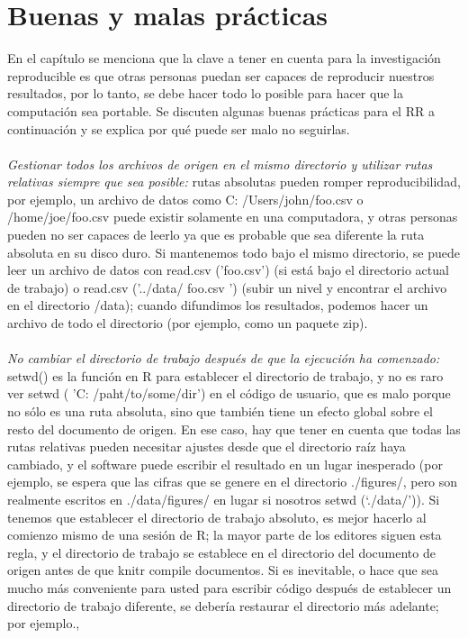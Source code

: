 \documentclass[conference]{IEEEtran}
\begin{document}
\section{Buenas y malas prácticas}
En el capítulo se menciona que la clave a tener en cuenta para la investigación reproducible es que otras personas puedan ser capaces de reproducir nuestros resultados, por lo tanto, se debe hacer todo lo posible para hacer que la computación sea portable. Se discuten algunas buenas prácticas para el RR a continuación y se explica por qué puede ser malo no seguirlas.\\\\
\textit{Gestionar todos los archivos de origen en el mismo directorio y utilizar rutas relativas siempre que sea posible:} rutas absolutas pueden romper reproducibilidad, por ejemplo, un archivo de datos como C: /Users/john/foo.csv o /home/joe/foo.csv puede existir solamente en una computadora, y otras personas pueden no ser capaces de leerlo ya que es probable que sea diferente la ruta absoluta en su disco duro. Si mantenemos todo bajo el mismo directorio, se puede leer un archivo de datos con read.csv ('foo.csv') (si está bajo el directorio actual de trabajo) o read.csv ('../data/ foo.csv ') (subir un nivel y encontrar el archivo en el directorio /data); cuando difundimos los resultados, podemos hacer un archivo de todo el directorio (por ejemplo, como un paquete zip).\\\\
\textit{No cambiar el directorio de trabajo después de que la ejecución ha comenzado:} setwd() es la función en R para establecer el directorio de trabajo, y no es raro ver setwd ( 'C: /paht/to/some/dir') en el código de usuario, que es malo porque no sólo es una ruta absoluta, sino que también tiene un efecto global sobre el resto del documento de origen. En ese caso, hay que tener en cuenta que todas las rutas relativas pueden necesitar ajustes desde que el directorio raíz haya cambiado, y el software puede escribir el resultado en un lugar inesperado (por ejemplo, se espera que las cifras que se genere en el directorio ./figures/, pero son realmente escritos en ./data/figures/ en lugar si nosotros setwd (‘./data/')). Si tenemos que establecer el directorio de trabajo absoluto, es mejor hacerlo al comienzo mismo de una sesión de R; la mayor parte de los editores  siguen esta regla, y el directorio de trabajo se establece en el directorio del documento de origen antes de que knitr compile documentos. Si es inevitable, o hace que sea mucho más conveniente para usted para escribir código después de establecer un directorio de trabajo diferente, se debería restaurar el directorio más adelante; por ejemplo.,\\\\
\end{document}
